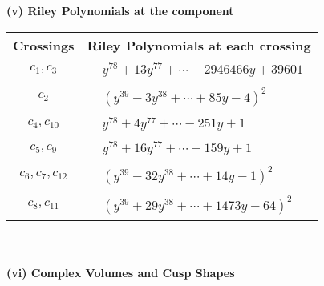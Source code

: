 \documentclass[1p]{elsarticle_modified}
\theoremstyle{definition}
\begin{document}
\newpage\renewcommand{\arraystretch}{1}
\flushleft \textbf{(v) Riley Polynomials at the component}\newline \\
\begin{tabular}{m{50pt}|m{274pt}}
Crossings & \hspace{64pt}Riley Polynomials at each crossing \\
\hline $$\begin{aligned}c_{1},c_{3}\end{aligned}$$&$\begin{aligned}
&y^{78}+13 y^{77}+\cdots-2946466 y+39601
\end{aligned}$\\
\hline $$\begin{aligned}c_{2}\end{aligned}$$&$\begin{aligned}
&(y^{39}-3 y^{38}+\cdots+85 y-4)^{2}
\end{aligned}$\\
\hline $$\begin{aligned}c_{4},c_{10}\end{aligned}$$&$\begin{aligned}
&y^{78}+4 y^{77}+\cdots-251 y+1
\end{aligned}$\\
\hline $$\begin{aligned}c_{5},c_{9}\end{aligned}$$&$\begin{aligned}
&y^{78}+16 y^{77}+\cdots-159 y+1
\end{aligned}$\\
\hline $$\begin{aligned}c_{6},c_{7},c_{12}\end{aligned}$$&$\begin{aligned}
&(y^{39}-32 y^{38}+\cdots+14 y-1)^{2}
\end{aligned}$\\
\hline $$\begin{aligned}c_{8},c_{11}\end{aligned}$$&$\begin{aligned}
&(y^{39}+29 y^{38}+\cdots+1473 y-64)^{2}
\end{aligned}$\\
\hline
\end{tabular}\\~\\
\newpage\flushleft \textbf{(vi) Complex Volumes and Cusp Shapes}
\end{document}
